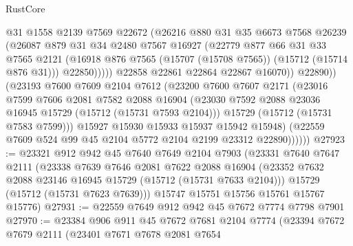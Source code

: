 \begin{lexlean}{RustCore}
\begin{coremodule}
                        @31
                        @1558
                        @2139
                        @7569
                        @22672
                        (@26216
                          @880
                          @31
                          @35
                          @6673
                          @7568
                          @26239
                          (@26087
                            @879
                            @31
                            @34
                            @2480
                            @7567
                            @16927
                            (@22779
                              @877
                              @66
                              @31
                              @33
                              @7565
                              @2121
                              (@16918 @876 @7565 (@15707 (@15708 @7565)) (@15712 (@15714 @876 @31)))
                              @22850)))))
                    @22858
                    @22861
                    @22864
                    @22867
                    @16070))
                @22890))
            (@23193
              @7600
              @7609
              @2104
              @7612
              (@23200
                @7600
                @7607
                @2171
                (@23016
                  @7599
                  @7606
                  @2081
                  @7582
                  @2088
                  @16904
                  (@23030 @7592 @2088 @23036 @16945 @15729 (@15712 (@15731 @7593 @2104)))
                  @15729
                  (@15712 (@15731 @7583 @7599)))
                @15927
                @15930
                @15933
                @15937
                @15942
                @15948)
              (@22559 @7609 @524 @99 @45 @2104 @5772 @2104 @2199 @23312 @22890))))))
@27923 := @23321
    @912
    @942
    @45
    @7640
    @7649
    @2104
    @7903
    (@23331
      @7640
      @7647
      @2111
      (@23338
        @7639
        @7646
        @2081
        @7622
        @2088
        @16904
        (@23352 @7632 @2088 @23146 @16945 @15729 (@15712 (@15731 @7633 @2104)))
        @15729
        (@15712 (@15731 @7623 @7639)))
      @15747
      @15751
      @15756
      @15761
      @15767
      @15776)
@27931 := @22559 @7649 @912 @942 @45 @7672 @7774 @7798 @7901
@27970 := @23384
    @906
    @911
    @45
    @7672
    @7681
    @2104
    @7774
    (@23394
      @7672
      @7679
      @2111
      (@23401
        @7671
        @7678
        @2081
        @7654

\end{coremodule}
\end{lexlean}
